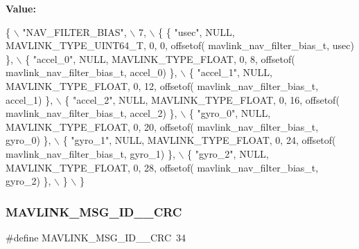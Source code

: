 {\bfseries Value\+:}
\begin{DoxyCode}
\{ \(\backslash\)
    \textcolor{stringliteral}{"NAV\_FILTER\_BIAS"}, \(\backslash\)
    7, \(\backslash\)
    \{  \{ \textcolor{stringliteral}{"usec"}, NULL, MAVLINK_TYPE_UINT64_T, 0, 0, offsetof(
      mavlink_nav_filter_bias_t, usec) \}, \(\backslash\)
         \{ \textcolor{stringliteral}{"accel\_0"}, NULL, MAVLINK_TYPE_FLOAT, 0, 8, offsetof(
      mavlink_nav_filter_bias_t, accel\_0) \}, \(\backslash\)
         \{ \textcolor{stringliteral}{"accel\_1"}, NULL, MAVLINK_TYPE_FLOAT, 0, 12, offsetof(
      mavlink_nav_filter_bias_t, accel\_1) \}, \(\backslash\)
         \{ \textcolor{stringliteral}{"accel\_2"}, NULL, MAVLINK_TYPE_FLOAT, 0, 16, offsetof(
      mavlink_nav_filter_bias_t, accel\_2) \}, \(\backslash\)
         \{ \textcolor{stringliteral}{"gyro\_0"}, NULL, MAVLINK_TYPE_FLOAT, 0, 20, offsetof(
      mavlink_nav_filter_bias_t, gyro\_0) \}, \(\backslash\)
         \{ \textcolor{stringliteral}{"gyro\_1"}, NULL, MAVLINK_TYPE_FLOAT, 0, 24, offsetof(
      mavlink_nav_filter_bias_t, gyro\_1) \}, \(\backslash\)
         \{ \textcolor{stringliteral}{"gyro\_2"}, NULL, MAVLINK_TYPE_FLOAT, 0, 28, offsetof(
      mavlink_nav_filter_bias_t, gyro\_2) \}, \(\backslash\)
         \} \(\backslash\)
\}
\end{DoxyCode}
\mbox{\label{mavlink__msg__nav__filter__bias_8h_a50081844c1676dd4cec99b1cfdcc90da}} 
\subsubsection{M\+A\+V\+L\+I\+N\+K\+\_\+\+M\+S\+G\+\_\+\+I\+D\+\_\+\_\+\+C\+RC}
{\footnotesize\ttfamily \#define M\+A\+V\+L\+I\+N\+K\+\_\+\+M\+S\+G\+\_\+\+I\+D\+\_\+\_\+\+C\+RC~34}

\mbox{\label{mavlink__msg__nav__filter__bias_8h_a1fdd4656b1a4567e60da2be3070ce9ad}} 
